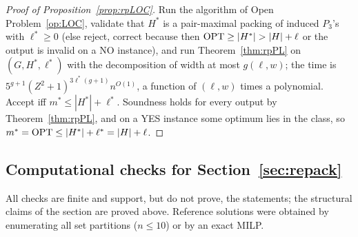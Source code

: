 \begin{proof}[Proof of Proposition~\ref{prop:rpLOC}]
Run the algorithm of Open Problem~\ref{op:LOC}, validate that $H^*$ is a pair-maximal packing of induced $P_3$'s with $\ell^*\ge0$ (else reject, correct because then $\OPT\ge|H^*|>|H|+\ell$ or the output is invalid on a NO instance), and run Theorem~\ref{thm:rpPL} on $(G,H^*,\ell^*)$ with the decomposition of width at most $g(\ell,w)$; the time is $5^{g+1}(Z^2+1)^{3\ell^*(g+1)}n^{O(1)}$, a function of $(\ell,w)$ times a polynomial. Accept iff $m^*\le|H^*|+\ell^*$. Soundness holds for every output by Theorem~\ref{thm:rpPL}, and on a YES instance some optimum lies in the class, so $m^*=\mathrm{OPT}\le|H^*|+\ell^*=|H|+\ell$.
\end{proof}

\subsection{Computational checks for Section~\ref{sec:repack}}
All checks are finite and support, but do not prove, the statements; the structural claims of the section are proved above. Reference solutions were obtained by enumerating all set partitions ($n\le10$) or by an exact MILP.
